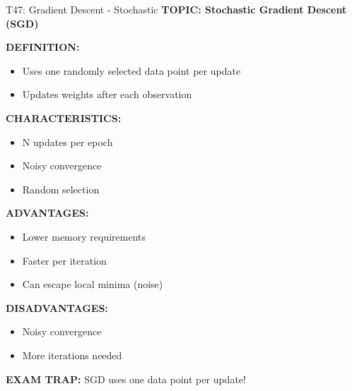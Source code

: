 \documentclass[8pt]{beamer}
\begin{document}
	\begin{frame}{T47: Gradient Descent - Stochastic}
		\fontsize{6.5}{7.5}\selectfont
		\textbf{TOPIC: Stochastic Gradient Descent (SGD)}
		
		\vspace{0.1cm}
		\textbf{DEFINITION:}
		\begin{itemize}
			\item Uses one randomly selected data point per update
			\item Updates weights after each observation
		\end{itemize}
		
		\vspace{0.1cm}
		\textbf{CHARACTERISTICS:}
		\begin{itemize}
			\item N updates per epoch
			\item Noisy convergence
			\item Random selection
		\end{itemize}
		
		\vspace{0.1cm}
		\textbf{ADVANTAGES:}
		\begin{itemize}
			\item Lower memory requirements
			\item Faster per iteration
			\item Can escape local minima (noise)
		\end{itemize}
		
		\vspace{0.1cm}
		\textbf{DISADVANTAGES:}
		\begin{itemize}
			\item Noisy convergence
			\item More iterations needed
		\end{itemize}
		
		\textcolor{myred}{\textbf{EXAM TRAP:}} SGD uses \textcolor{myblue}{one data point} per update!
	\end{frame}
	
\end{document}
